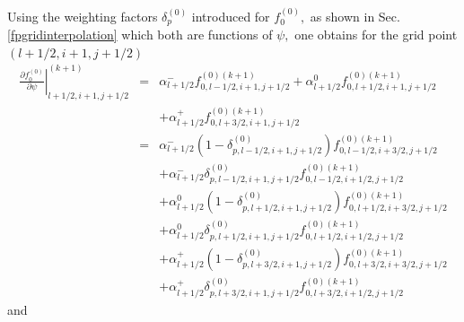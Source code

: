 Using the weighting factors $\delta _{p}^{(0)}$ introduced for $%
f_{0}^{\left( 0\right) },$ as shown in Sec. \ref{fpgridinterpolation} which
both are functions of $\psi ,$ one obtains for the grid point $\left(
l+1/2,i+1,j+1/2\right) $%
\begin{eqnarray}
\left. \frac{\partial f_{0}^{(0)}}{\partial \psi }\right|
_{l+1/2,i+1,j+1/2}^{(k+1)} &=&\alpha
_{l+1/2}^{-}f_{0,l-1/2,i+1,j+1/2}^{(0)(k+1)}+\alpha
_{l+1/2}^{0}f_{0,l+1/2,i+1,j+1/2}^{(0)(k+1)}  \nonumber \\
&&+\alpha _{l+1/2}^{+}f_{0,l+3/2,i+1,j+1/2}^{(0)(k+1)}  \nonumber \\
&=&\alpha _{l+1/2}^{-}\left( 1-\delta _{p,l-1/2,i+1,j+1/2}^{(0)}\right)
f_{0,l-1/2,i+3/2,j+1/2}^{(0)(k+1)}  \nonumber \\
&&+\alpha _{l+1/2}^{-}\delta
_{p,l-1/2,i+1,j+1/2}^{(0)}f_{0,l-1/2,i+1/2,j+1/2}^{(0)(k+1)}  \nonumber \\
&&+\alpha _{l+1/2}^{0}\left( 1-\delta _{p,l+1/2,i+1,j+1/2}^{(0)}\right)
f_{0,l+1/2,i+3/2,j+1/2}^{(0)(k+1)}  \nonumber \\
&&+\alpha _{l+1/2}^{0}\delta
_{p,l+1/2,i+1,j+1/2}^{(0)}f_{0,l+1/2,i+1/2,j+1/2}^{(0)(k+1)}  \nonumber \\
&&+\alpha _{l+1/2}^{+}\left( 1-\delta _{p,l+3/2,i+1,j+1/2}^{(0)}\right)
f_{0,l+3/2,i+3/2,j+1/2}^{(0)(k+1)}  \nonumber \\
&&+\alpha _{l+1/2}^{+}\delta
_{p,l+3/2,i+1,j+1/2}^{(0)}f_{0,l+3/2,i+1/2,j+1/2}^{(0)(k+1)}
\end{eqnarray}
and


